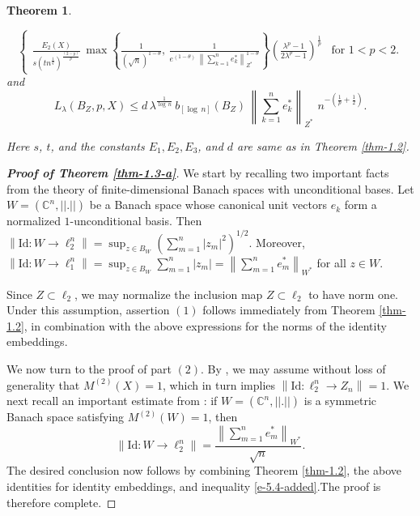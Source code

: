 \documentclass[a4paper,11pt, reqno]{amsart}
\newtheorem{thm}{Theorem}[section]
\theoremstyle{definition}
\newcommand{\norm}[1]{\left\lVert#1\right\rVert}
\begin{document}
\begin{thm}
\begin{enumerate}
\begin{equation*}
\begin{cases}
				\frac{E_{2}(X)}{s\left(t n^{\frac{1}{q}}\right)^{\frac{(2-p)}{p}}}\,  \max \left\{\frac{1}{(\sqrt{n})^{1-\theta}}, \, \frac{1}{e^{(1-\theta)}\, \norm{\sum_{k=1}^{n}e^{*}_{k}}_{Z^{*}}^{1-\theta}}\right\}\left(\frac{\lambda^p -1}{2\lambda^p - 1}\right)^{\frac{1}{p}}  & \text{for $1<p< 2$}. 
			\end{cases}
		\end{equation*}
		and 
		$$L_{\lambda}(B_{Z}, p,X) \leq d\,  \lambda^{\frac{1}{\log \,n}}\,b_{[\log\,n]}(B_Z)\, \norm{\sum_{k=1}^{n}e^{*}_{k}}_{Z^{*}}\,\,n^{-\left(\frac{1}{p}+\frac{1}{2}\right)}.
		$$
	\end{enumerate}
	Here $s$, $t$, and the constants $E_{1}, E_{2}, E_{3}$, and $d$ are same as in Theorem \ref{thm-1.2}.
\end{thm}
\begin{proof} [{\bf Proof of Theorem \ref{thm-1.3-a}}]
	We start by recalling two important facts from the theory of finite-dimensional Banach spaces with unconditional bases. Let $W=(\mathbb{C}^n, ||.||)$ be a Banach space whose canonical unit vectors $e_{k}$ form a normalized $1$-unconditional basis. Then  $\norm{\mathrm{Id}: W \rightarrow \ell_2^n}=\sup_{z \in B_{W}}(\sum_{m=1}^{n}|z_{m}|^2)^{1/2}$. Moreover, $\norm{\mathrm{Id}: W \rightarrow \ell_1^n}=\sup_{z \in B_{W}} \sum_{m=1}^{n}|z_{m}|=\norm{\sum_{m=1}^{n}e^{*}_{m}}_{W^{*}}$ for all $z \in W$. 
	\medspace
	
	Since $Z \subset \ell_2$, we may normalize the inclusion map $Z \subset \ell_2$ to have norm one. Under this assumption, assertion $(1)$ follows immediately from Theorem \ref{thm-1.2}, in combination with the above expressions for the norms of the identity embeddings.
	\vspace{1mm}
	
	We now turn to the proof of part $(2)$. By \cite[Theorem 1.d.5]{Lindenstrauss-book}, we may assume without loss of generality that $M^{(2)}(X)=1$, which in turn implies $\norm{\mathrm{Id}: \ell_2^n \rightarrow Z_{n}}=1$. We next recall an important estimate from  \cite[(5.3), p. 191]{defant-2003}: if $W=(\mathbb{C}^n, ||.||)$ is a symmetric Banach space satisfying $M^{(2)}(W)=1$, then 
	\begin{equation} \label{e-5.4-added}
		\norm{\mathrm{Id}: W \rightarrow \ell^n_2}= \frac{\norm{\sum_{m=1}^{n}e^{*}_{m}}_{W^{*}}}{\sqrt{n}}.
	\end{equation}
	The desired conclusion now follows by combining Theorem \ref{thm-1.2}, the above identities for identity embeddings, and inequality \eqref{e-5.4-added}.The proof is therefore complete.	
\end{proof}
\end{document}
